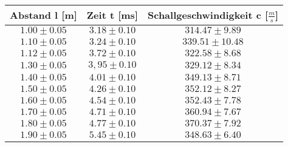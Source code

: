 \begin{tabular}{|c|c|c|}
Abstand l [m] & Zeit t [ms] & Schallgeschwindigkeit c [\(\frac{m}{s}\)]\\
\hline
\(1.00 \pm 0.05\) & \(3.18 \pm 0.10\) & \(314.47 \pm 9.89\)\\
\(1.10 \pm 0.05\) & \(3.24 \pm 0.10\) & \(339.51 \pm 10.48\)\\
\(1.12 \pm 0.05\) & \(3.72 \pm 0.10\) & \(322.58 \pm 8.68\)\\
\(1.30 \pm 0.05\) & \(3,95 \pm 0.10\) & \(329.12 \pm 8.34\)\\
\(1.40 \pm 0.05\) & \(4.01 \pm 0.10\) & \(349.13 \pm 8.71\)\\
\(1.50 \pm 0.05\) & \(4.26 \pm 0.10\) & \(352.12 \pm 8.27\)\\
\(1.60 \pm 0.05\) & \(4.54 \pm 0.10\) & \(352.43 \pm 7.78\)\\
\(1.70 \pm 0.05\) & \(4.71 \pm 0.10\) & \(360.94 \pm 7.67\)\\
\(1.80 \pm 0.05\) & \(4.77 \pm 0.10\) & \(370.37 \pm 7.92\)\\
\(1.90 \pm 0.05\) & \(5.45 \pm 0.10\) & \(348.63 \pm 6.40\)\\
\hline
\end{tabular}